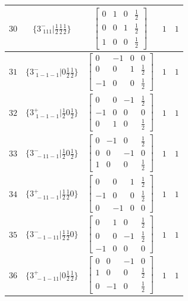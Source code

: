 \documentclass[fleqn,8pt]{jsarticle}
\begin{document}
\begin{longtable}{ccccc}
$ 30 $ & $ \{3^{-}_{\,\,111}|\frac{1}{2} \frac{1}{2} \frac{1}{2}\} $ & $ \begin{bmatrix} 0 & 1 & 0 & \frac{1}{2} \\ 0 & 0 & 1 & \frac{1}{2} \\ 1 & 0 & 0 & \frac{1}{2} \end{bmatrix} $ & $ 1 $ & $ 1 $ \\ \hline
$ 31 $ & $ \{3^{-}_{\,\,1-1-1}|0 \frac{1}{2} \frac{1}{2}\} $ & $ \begin{bmatrix} 0 & -1 & 0 & 0 \\ 0 & 0 & 1 & \frac{1}{2} \\ -1 & 0 & 0 & \frac{1}{2} \end{bmatrix} $ & $ 1 $ & $ 1 $ \\ \hline
$ 32 $ & $ \{3^{+}_{\,\,1-1-1}|\frac{1}{2} 0 \frac{1}{2}\} $ & $ \begin{bmatrix} 0 & 0 & -1 & \frac{1}{2} \\ -1 & 0 & 0 & 0 \\ 0 & 1 & 0 & \frac{1}{2} \end{bmatrix} $ & $ 1 $ & $ 1 $ \\ \hline
$ 33 $ & $ \{3^{-}_{\,\,-11-1}|\frac{1}{2} 0 \frac{1}{2}\} $ & $ \begin{bmatrix} 0 & -1 & 0 & \frac{1}{2} \\ 0 & 0 & -1 & 0 \\ 1 & 0 & 0 & \frac{1}{2} \end{bmatrix} $ & $ 1 $ & $ 1 $ \\ \hline
$ 34 $ & $ \{3^{+}_{\,\,-11-1}|\frac{1}{2} \frac{1}{2} 0\} $ & $ \begin{bmatrix} 0 & 0 & 1 & \frac{1}{2} \\ -1 & 0 & 0 & \frac{1}{2} \\ 0 & -1 & 0 & 0 \end{bmatrix} $ & $ 1 $ & $ 1 $ \\ \hline
$ 35 $ & $ \{3^{-}_{\,\,-1-11}|\frac{1}{2} \frac{1}{2} 0\} $ & $ \begin{bmatrix} 0 & 1 & 0 & \frac{1}{2} \\ 0 & 0 & -1 & \frac{1}{2} \\ -1 & 0 & 0 & 0 \end{bmatrix} $ & $ 1 $ & $ 1 $ \\ \hline
$ 36 $ & $ \{3^{+}_{\,\,-1-11}|0 \frac{1}{2} \frac{1}{2}\} $ & $ \begin{bmatrix} 0 & 0 & -1 & 0 \\ 1 & 0 & 0 & \frac{1}{2} \\ 0 & -1 & 0 & \frac{1}{2} \end{bmatrix} $ & $ 1 $ & $ 1 $ \\ \hline

\end{longtable}
\end{document}

